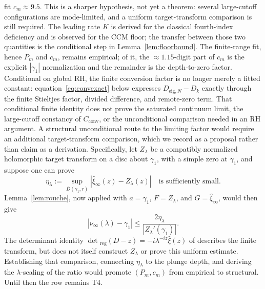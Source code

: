 \documentclass[11pt,a4paper]{article}
\begin{document}
fit $c_m\approx9.5$. This is a sharper hypothesis, not yet a theorem: several
large-cutoff configurations are mode-limited, and a uniform target-transform
comparison is still required. The leading rate $K$ is derived for the
classical fourth-index deficiency and is observed for the CCM floor; the
transfer between those two quantities is the conditional step in
Lemma~\ref{lem:floorbound}. The
finite-range fit, hence $P_m$ and $c_m$, remains empirical; of it, the
$\approx1.15$-digit part of $c_m$ is the explicit $|\gamma_1|$ normalization and
the remainder is the depth-to-zero factor. Conditional on global RH, the finite conversion factor is no longer merely a
fitted constant: equation~\eqref{eq:convexact} below expresses
$D_{\mathrm{eig},N}-D_k$ exactly through the finite Stieltjes factor, divided
difference, and remote-zero term. That conditional finite identity does not
prove the saturated continuum limit, the large-cutoff constancy of
$C_{\mathrm{conv}}$, or the unconditional comparison needed in an RH argument.
A structural unconditional route to the limiting factor would require an
additional target-transform comparison, which we record as a proposal rather
than claim as a derivation. Specifically, let $Z_\lambda$ be a
compatibly normalized holomorphic target transform on a disc about $\gamma_1$,
with a simple zero at $\gamma_1$, and suppose one can prove
\[
  \eta_\lambda:=
  \sup_{\overline D(\gamma_1,r)}
  |\widehat\xi_\infty(z)-Z_\lambda(z)|
  \quad\text{is sufficiently small}.
\]
Lemma~\ref{lem:rouche}, now applied with $a=\gamma_1$,
$F=Z_\lambda$, and $G=\widehat\xi_\infty$, would then give
\[
  |\nu_\infty(\lambda)-\gamma_1|
  \le \frac{2\eta_\lambda}{|Z_\lambda'(\gamma_1)|}.
\]
The determinant identity
$\det{}_{\!\mathrm{reg}}(D-z)=-i\lambda^{-iz}\widehat\xi(z)$ of
\cite[Thm.~5.10]{CCM2025} describes the finite transform, but does not itself
construct $Z_\lambda$ or prove this uniform estimate. Establishing that
comparison, connecting $\eta_\lambda$ to the plunge depth, and deriving the
$\lambda$-scaling of the ratio would promote $(P_m,c_m)$ from empirical to
structural. Until then the row remains T4.
\end{document}
